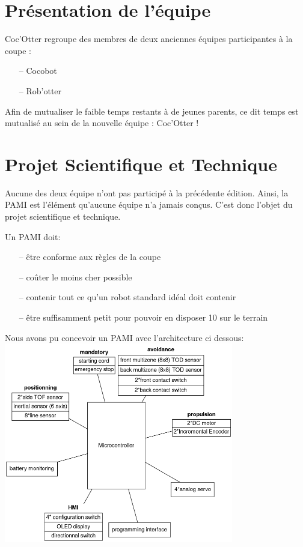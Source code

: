 \documentclass{article}
\begin{document}
\section{Présentation de l'équipe}
Coc'Otter regroupe des membres de deux anciennes équipes participantes à la coupe : 
\begin{itemize}
\item[--] Cocobot
\item[--] Rob'otter
\end{itemize}
Afin de mutualiser le faible temps restants à de jeunes parents, ce dit temps est mutualisé au sein de la nouvelle équipe : Coc'Otter !

\section{Projet Scientifique et Technique}

Aucune des deux équipe n'ont pas participé à la précédente édition. Ainsi, la PAMI est l'élément qu'aucune équipe n'a jamais conçus.
C'est donc l'objet du projet scientifique et technique.

Un PAMI doit: 
\begin{itemize}
\item[--] être conforme aux règles de la coupe
\item[--] coûter le moins cher possible
\item[--] contenir tout ce qu'un robot standard idéal doit contenir
\item[--] être suffisamment petit pour pouvoir en disposer 10 sur le terrain
\end{itemize}

Nous avons pu concevoir un PAMI avec l'architecture ci dessous:\\
\includegraphics[width = 10cm]{projet_scientifique_technique_2025}
\end{document}
